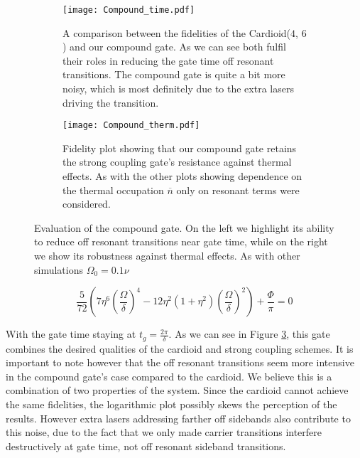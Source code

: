 \documentclass[12pt,twoside]{report}
\begin{document}
\begin{figure}[b!]
	\centering
	\begin{subfigure}[t]{0.475\textwidth}
		\centering
		\texttt{[image: Compound\_time.pdf]}
		\caption{A comparison between the fidelities of the Cardioid($4$, $6$) and our compound gate. As we can see both fulfil their roles in reducing the gate time off resonant transitions. The compound gate is quite a bit more noisy, which is most definitely due to the extra lasers driving the transition.}
		\label{fig:compound:time}
	\end{subfigure}
	\hfill
	\begin{subfigure}[t]{0.475\textwidth}
		\centering
		\texttt{[image: Compound\_therm.pdf]}
		\caption{Fidelity plot showing that our compound gate retains the strong coupling gate's resistance against thermal effects. As with the other plots showing dependence on the thermal occupation $\overline{n}$ only on resonant terms were considered.}
		\label{fig:compound:therm}
	\end{subfigure}
	\caption[Cardioid gate comparison]{Evaluation of the compound gate. On the left we highlight its ability to reduce off resonant transitions near gate time, while on the right we show its robustness against thermal effects. As with other simulations $\Omega_0=0.1\nu$}
	\label{fig:compound}
\end{figure}

\begin{equation}
	\frac{5}{72}\left(7\eta^6\left(\frac{\Omega}{\delta}\right)^4-12\eta^2\left(1+\eta^2\right)\left(\frac{\Omega}{\delta}\right)^2\right) + \frac{\Phi}{\pi} = 0
	\label{eq:compound_entangling}
\end{equation}

With the gate time staying at $t_g = \frac{2\pi}{\delta}$. As we can see in Figure \ref{fig:compound}, this gate combines the desired qualities of the cardioid and strong coupling schemes. It is important to note however that the off resonant transitions seem more intensive in the compound gate's case compared to the cardioid. We believe this is a combination of two properties of the system. Since the cardioid cannot achieve the same fidelities, the logarithmic plot possibly skews the perception of the results. However extra lasers addressing farther off sidebands also contribute to this noise, due to the fact that we only made carrier transitions interfere destructively at gate time, not off resonant sideband transitions.
\end{document}
